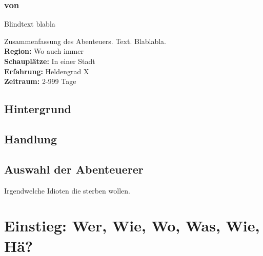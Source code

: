 \documentclass[12pt, a4paper, twoside, openany]{book}
\begin{document}
\begin{multicols}{2}
        \subsubsection*{von \MyAuthor}
        Blindtext blabla
        \begin{spmbox}
                {\begin{center}
                    \color{spmblue}
                    \Large
                    \textbf{\MyTitle}
                \end{center}}
             Zusammenfassung des Abenteuers. Text. Blablabla. \\
                \textbf{Region:} Wo auch immer\\
                \textbf{Schauplätze:} In einer Stadt\\
                \textbf{Erfahrung:} Heldengrad X\\
                \textbf{Zeitraum:} 2-999 Tage\\
        \end{spmbox}
        \subsection*{Hintergrund}
            \Blindtext[1][1]
        \subsection*{Handlung}
            \Blindtext[1][1]
        \subsection*{Auswahl der Abenteuerer}
            Irgendwelche Idioten die sterben wollen.             
\end{multicols}
\section*{Einstieg: Wer, Wie, Wo, Was, Wie, Hä?}
\end{document}
